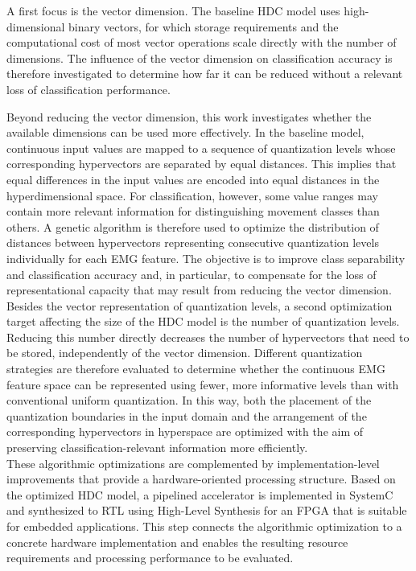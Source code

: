 A first focus is the vector dimension. The baseline \ac{HDC} model uses high-dimensional binary vectors, for which storage requirements and the computational cost of most vector operations scale directly with the number of dimensions. The influence of the vector dimension on classification accuracy is therefore investigated to determine how far it can be reduced without a relevant loss of classification performance.

Beyond reducing the vector dimension, this work investigates whether the available dimensions can be used more effectively. In the baseline model, continuous input values are mapped to a sequence of quantization levels whose corresponding hypervectors are separated by equal distances. This implies that equal differences in the input values are encoded into equal distances in the hyperdimensional space. For classification, however, some value ranges may contain more relevant information for distinguishing movement classes than others. A genetic algorithm is therefore used to optimize the distribution of distances between hypervectors representing consecutive quantization levels individually for each EMG feature. The objective is to improve class separability and classification accuracy and, in particular, to compensate for the loss of representational capacity that may result from reducing the vector dimension.\\

Besides the vector representation of quantization levels, a second optimization target affecting the size of the HDC model is the number of quantization levels. Reducing this number directly decreases the number of hypervectors that need to be stored, independently of the vector dimension. Different quantization strategies are therefore evaluated to determine whether the continuous EMG feature space can be represented using fewer, more informative levels than with conventional uniform quantization. In this way, both the placement of the quantization boundaries in the input domain and the arrangement of the corresponding hypervectors in hyperspace are optimized with the aim of preserving classification-relevant information more efficiently.\\

These algorithmic optimizations are complemented by implementation-level improvements that provide a hardware-oriented processing structure. Based on the optimized HDC model, a pipelined accelerator is implemented in SystemC and synthesized to RTL using High-Level Synthesis for an FPGA that is suitable for embedded applications. This step connects the algorithmic optimization to a concrete hardware implementation and enables the resulting resource requirements and processing performance to be evaluated.\\

